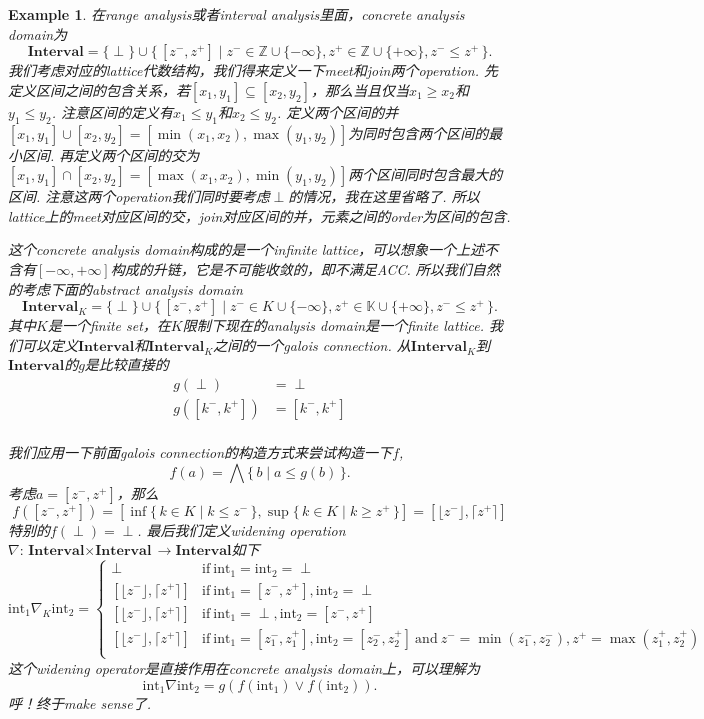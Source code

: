 \documentclass{article}
\newtheorem{example}[theorem]{Example}
\newcommand*{\xfunc}[4]{{#2}\colon{#3}{#1}{#4}}
\newcommand*{\func}[3]{\xfunc{\to}{#1}{#2}{#3}}
\newcommand\Set[2]{\{\,#1\mid#2\,\}} %
\begin{document}
\begin{example}
\rm 在range analysis或者interval analysis里面，concrete analysis domain为
$$
\textbf{Interval} = \{\perp\} \cup \Set{[z^-,z^+]}{z^- \in \mathbb{Z} \cup \{-\infty\}, z^+ \in \mathbb{Z} \cup \{+\infty\}, z^- \leq z^+ }.
$$
我们考虑对应的lattice代数结构，我们得来定义一下meet和join两个operation. 先定义区间之间的包含关系，若$[x_1,y_1] \subseteq [x_2,y_2]$，那么当且仅当$x_1 \geq x_2$和$y_1 \leq y_2$. 注意区间的定义有$x_1 \leq y_1$和$x_2 \leq y_2$. 定义两个区间的并$[x_1, y_1] \cup [x_2, y_2] = [\min(x_1,x_2),\max(y_1,y_2)]$为同时包含两个区间的最小区间. 再定义两个区间的交为$[x_1, y_1] \cap [x_2, y_2] = [\max(x_1,x_2),\min(y_1,y_2)]$两个区间同时包含最大的区间. 注意这两个operation我们同时要考虑$\perp$的情况，我在这里省略了. 所以lattice上的meet对应区间的交，join对应区间的并，元素之间的order为区间的包含.

这个concrete analysis domain构成的是一个infinite lattice，可以想象一个上述不含有$[-\infty, +\infty]$构成的升链，它是不可能收敛的，即不满足ACC. 所以我们自然的考虑下面的abstract analysis domain
$$
\textbf{Interval}_K = \{\perp\} \cup \Set{[z^-,z^+]}{z^- \in K \cup \{-\infty\}, z^+ \in \mathbb{K} \cup \{+\infty\}, z^- \leq z^+ }.
$$
其中$K$是一个finite set，在$K$限制下现在的analysis domain是一个finite lattice. 我们可以定义$\textbf{Interval}$和$\textbf{Interval}_K$之间的一个galois connection. 从$\textbf{Interval}_K$到$\textbf{Interval}$的$g$是比较直接的
$$
\begin{aligned}
g(\perp) &= \perp \\
g([k^-,k^+]) &= [k^-, k^+] \\
\end{aligned}
$$

我们应用一下前面galois connection的构造方式来尝试构造一下$f$,
$$
f(a) = \bigwedge\Set{b}{a \leq g(b)}.
$$
考虑$a = [z^-, z^+]$，那么
$$
f([z^-,z^+]) =[\inf\Set{k \in K}{k \leq z^-}, \sup\Set{k \in K}{k \geq z^+}] = [\lfloor z^- \rfloor, \lceil z^+ \rceil]
$$
特别的$f(\perp) = \perp$. 最后我们定义widening operation $\func{\nabla}{\textbf{Interval} \times \textbf{Interval}}{\textbf{Interval}}$如下
$$
\text{int}_1 \nabla_K \text{int}_2 =\left\{ \begin{array}{ll} 
\perp & \text{if}~\text{int}_1 = \text{int}_2 = \perp\\
\left[\lfloor z^- \rfloor, \lceil z^+ \rceil \right] & \text{if}~\text{int}_1 = [z^-,z^+] ,\text{int}_2 = \perp \\
\left[\lfloor z^- \rfloor, \lceil z^+ \rceil \right] & \text{if}~\text{int}_1 = \perp ,\text{int}_2 = [z^-,z^+] \\
\left[\lfloor z^- \rfloor, \lceil z^+ \rceil \right] & \text{if}~\text{int}_1 = [z_1^-,z_1^+] ,\text{int}_2 = [z_2^-,z_2^+] ~ \text{and}~ z^- = \min(z_1^-,z_2^-), z^+ = \max(z_1^+,z_2^+)\\
\end{array} \right.
$$
这个widening operator是直接作用在concrete analysis domain上，可以理解为
$$
\text{int}_1 \nabla \text{int}_2 = g(f(\text{int}_1) \vee f(\text{int}_2)).
$$
呼！终于make sense了.


\end{example}
\end{document}

